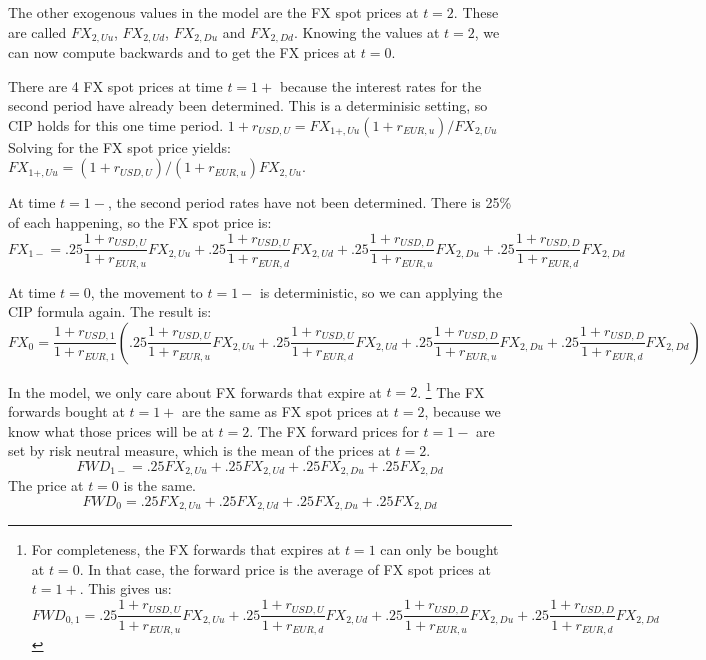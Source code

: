 The other exogenous values in the model are the FX spot prices at $t=2$.  These are called $FX_{2,Uu}$, $FX_{2,Ud}$, $FX_{2,Du}$ and $FX_{2,Dd}$.  Knowing the values at $t=2$, we can now compute backwards and to get the FX prices at $t=0$.

There are 4 FX spot prices at time $t=1+$ because the interest rates for the second period have already been determined.  This is a determinisic setting, so CIP holds for this one time period.  $1+r_{USD,U} = FX_{1+,Uu}(1+r_{EUR,u})/FX_{2,Uu}$  Solving for the FX spot price yields:  $FX_{1+,Uu} = (1+r_{USD,U})/(1+r_{EUR,u})FX_{2,Uu}$.  

At time $t=1-$, the second period rates have not been determined.  There is 25\% of each happening, so the FX spot price is:
\[ FX_{1-} = .25 \frac{1 + r_{USD,U}}{1 + r_{EUR,u}}FX_{2,Uu} + 
                                                            .25 \frac{1+r_{USD,U}}{1+r_{EUR,d}}FX_{2,Ud} + 
                                                            .25 \frac{1+r_{USD,D}}{1+r_{EUR,u}}FX_{2,Du} + 
                                                            .25 \frac{1+r_{USD,D}}{1+r_{EUR,d}}FX_{2,Dd} \]

At time $t=0$, the movement to $t=1-$ is deterministic, so we can applying the CIP formula again.  The result is:
\[ FX_{0} = \frac{1+r_{USD,1}}{1+r_{EUR,1}}( .25 \frac{1+r_{USD,U}}{1+r_{EUR,u}}FX_{2,Uu} + 
                                                            .25 \frac{1+r_{USD,U}}{1+r_{EUR,d}}FX_{2,Ud} + 
                                                            .25 \frac{1+r_{USD,D}}{1+r_{EUR,u}}FX_{2,Du} + 
                                                            .25 \frac{1+r_{USD,D}}{1+r_{EUR,d}}FX_{2,Dd}) \]

In the model, we only care about FX forwards that expire at $t=2$. \footnote{For completeness, the FX forwards that expires at $t=1$ can only be bought at $t=0$.  In that case, the forward price is the average of FX spot prices at $t=1+$.  This gives us:
\[ FWD_{0,1} = .25 \frac{1 + r_{USD,U}}{1 + r_{EUR,u}}FX_{2,Uu} + 
                                                            .25 \frac{1+r_{USD,U}}{1+r_{EUR,d}}FX_{2,Ud} + 
                                                            .25 \frac{1+r_{USD,D}}{1+r_{EUR,u}}FX_{2,Du} + 
                                                            .25 \frac{1+r_{USD,D}}{1+r_{EUR,d}}FX_{2,Dd} \]}  The FX forwards bought at $t=1+$ are the same as FX spot prices at $t=2$, because we know what those prices will be at $t=2$.  The FX forward prices for $t=1-$ are set by risk neutral measure, which is the mean of the prices at $t=2$.  
\[ FWD_{1-} = .25 FX_{2,Uu} +.25 FX_{2,Ud} +.25 FX_{2,Du} +.25 FX_{2,Dd} \]  
The price at $t=0$ is the same.
\[ FWD_{0} = .25 FX_{2,Uu} +.25 FX_{2,Ud} +.25 FX_{2,Du} +.25 FX_{2,Dd} \]  

